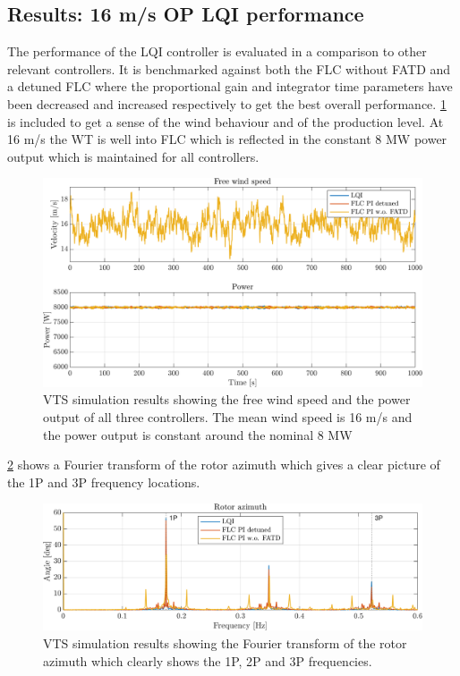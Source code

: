 \subsection{Results: 16 m/s OP LQI performance}
The performance of the LQI controller is evaluated in a comparison to other relevant controllers. It is benchmarked against both the FLC without FATD and a detuned FLC where the proportional gain and integrator time parameters have been decreased and increased respectively to get the best overall performance. \cref{fig:vts_1_wind_pow} is included to get a sense of the wind behaviour and of the production level. At 16 m/s the WT is well into FLC which is reflected in the constant 8 MW power output which is maintained for all controllers.
\begin{figure}[ht]
	\centering
	\includegraphics[width=0.7\linewidth]{Graphics/TestResults/VTSplotting/1_wind_pow.png}
	\caption{VTS simulation results showing the free wind speed and the power output of all three controllers. The mean wind speed is 16 m/s and the power output is constant around the nominal 8 MW}
	\label{fig:vts_1_wind_pow}
\end{figure}
\cref{fig:vts_2_fftazi} shows a Fourier transform of the rotor azimuth which gives a clear picture of the 1P and 3P frequency locations.
\begin{figure}[ht]
	\centering
	\includegraphics[width=0.7\linewidth]{Graphics/TestResults/VTSplotting/2_fftazi.png}
	\caption{VTS simulation results showing the Fourier transform of the rotor azimuth which clearly shows the 1P, 2P and 3P frequencies.}
	\label{fig:vts_2_fftazi}
\end{figure}

